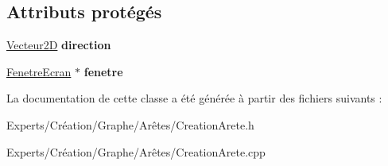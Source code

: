 \subsection*{Attributs protégés}
\begin{DoxyCompactItemize}
\item 
\mbox{\label{class_creation_arete_a966ea37f4dff099da7a73fc963c809e4}} 
\mbox{\hyperlink{class_vecteur2_d}{Vecteur2D}} {\bfseries direction}
\item 
\mbox{\label{class_creation_arete_a47da12077e394c4acc6353076782e8e0}} 
\mbox{\hyperlink{class_fenetre_ecran}{Fenetre\+Ecran}} $\ast$ {\bfseries fenetre}
\end{DoxyCompactItemize}


La documentation de cette classe a été générée à partir des fichiers suivants \+:\begin{DoxyCompactItemize}
\item 
Experts/\+Création/\+Graphe/\+Arêtes/Creation\+Arete.\+h\item 
Experts/\+Création/\+Graphe/\+Arêtes/Creation\+Arete.\+cpp\end{DoxyCompactItemize}
